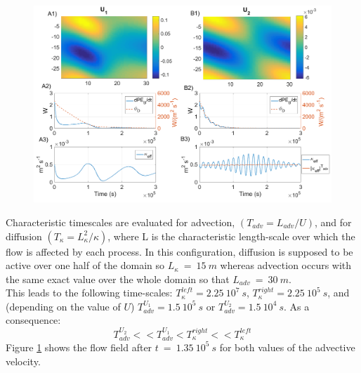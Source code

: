 \begin{figure}[h!]
\centering
\includegraphics[width=1\textwidth]{./CHAP_BPE/Fig_numlab_advdiff3.png}
\caption{ }
\label{fig4numlab}
\end{figure}
Characteristic timescales are evaluated for advection, $(T_{adv}=L_{adv}/U)$, and for diffusion $(T_{\kappa}=L_{\kappa}^2/{\kappa})$, where L is the characteristic length-scale over which the flow is affected by each process. In this configuration, diffusion is supposed to be active over one half of the domain so $L_{\kappa}\ =\ 15\ m$ whereas advection occurs with the same exact value over the whole domain so that $L_{adv}\ =\ 30\ m$.\\
This leads to the following time-scales: $T_{\kappa}^{left}=2.25 \ 10^7 \ s$, $T_{\kappa}^{right}=2.25 \ 10^5 \ s$, and (depending on the value of $U$) $T_{adv}^{U_1}=1.5 \ 10^5 \ s$ or $T_{adv}^{U_2}=1.5 \ 10^4 \ s$. As a consequence:
\begin{equation}
\displaystyle
T_{adv}^{U_2}<<T_{adv}^{U_1}<T_{\kappa}^{right}<<T_{\kappa}^{left}
\end{equation}
Figure \ref{fig4numlab} shows the flow field after $t\ =\ 1.35\ 10^5 \ s$ for both values of the advective velocity. \\
